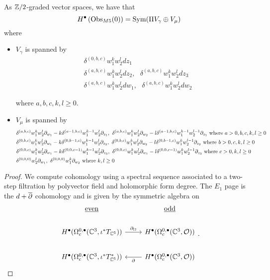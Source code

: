 \documentclass[11pt]{amsart}
\begin{document}
\begin{lem}
  As $\mathbb{Z}/2$-graded vector spaces, we have that \[H^{\bullet}\left ( {\rm Obs}_{M5}(0)\right )=\operatorname{Sym} (\Pi V_{\gamma}\oplus  V_{\mu})\] where
  \begin{itemize}
    \item $V_{\gamma}$ is spanned by
          \begin{align}
            & \delta^{(0,b,c)}w_{1}^{k}w_{2}^{l}dz_{1} \\
            & \delta^{(a,b,c)}w_{1}^{k}w_{2}^{l}dz_{2}, \ \ \
             \delta^{(a,b,c)}w_{1}^{k}w_{2}^{l}dz_{3} \\
            & \delta^{(a,b,c)}w_{1}^{k}w_{2}^{l}dw_{1}, \ \ \
            \delta^{(a,b,c)}w_{1}^{k}w_{2}^{l}dw_{2}
          \end{align}

          where $a, b, c, k, l \geq 0$.
    \item $V_{\mu}$ is spanned by
          \begin{align}
            & \delta^{(a,b,c)}w_{1}^{k}w_{2}^{l}\del_{w_1}-k\delta^{(a-1,b, c)}w_{1}^{k-1}w_{2}^{l}\del_{z_{1}},\
             \delta^{(a,b,c)}w_{1}^{k}w_{2}^{l}\del_{w_2}-l\delta^{(a-1,b, c)}w_{1}^{k-1}w_{2}^{l-1}\del_{z_{1}}\text{ where }a > 0, b,c,k,l \geq 0 \\
            & \delta^{(0,b,c)}w_{1}^{k}w_{2}^{l}\del_{w_1}-k\delta^{(0,b-1,c)}w_{1}^{k-1}w_{2}^{l}\del_{z_{2}}, \ \delta^{(0,b,c)}w_{1}^{k}w_{2}^{l}\del_{w_2}-l\delta^{(0,b-1,c)}w_{1}^{k}w_{2}^{l-1}\del_{z_{2}}\text{ where }b > 0,c,k,l \geq 0 \\
            & \delta^{(0,0,c)}w_{1}^{k}w_{2}^{l}\del_{w_1}-k\delta^{(0,0,c-1)}w_{1}^{k-1}w_{2}^{l}\del_{z_{3}}, \ \delta^{(0,0,c)}w_{1}^{k}w_{2}^{l}\del_{w_1}-l\delta^{(0,0,c-1)}w_{1}^{k}w_{2}^{l-1}\del_{z_{3}}\text{ where } c > 0,k,l \geq 0 \\
            & \delta^{(0,0,0)}w_{2}^{l}\del_{w_1}, \ \delta^{(0,0,0)}w_{1}^{k}\del_{w_2}\text{ where }k,l \geq 0
          \end{align}
  \end{itemize}
\end{lem}
\begin{proof}
  We compute cohomology using a spectral sequence associated to a two-step filtration by polyvector field and holomorphic form degree. The $E_{1}$ page is the $d+\overline{\partial}$ cohomology and is given by the symmetric algebra on

  \[
\begin{tikzcd}
\ul{\rm even} & \ul{\rm odd} \\
H^{\bullet}(\Omega^{0,\bullet}_{c} (\C^{3}, \iota^{*}T_{\C^{5}})) \ar[r, "\del_{\Omega}"] & H^{\bullet}(\Omega^{0,\bullet}_{c} (\C^{3}, \cO) )\\
H^{\bullet}(\Omega^{0,\bullet}_{c} (\C^{3},  \iota^{*}T^{*}_{\C^{5}}))& H^{\bullet}(\Omega^{0,\bullet}_{c} (\C^{3}, \cO)) \ar[l, "\del"]
\end{tikzcd}
.\]


\end{proof}
\end{document}
